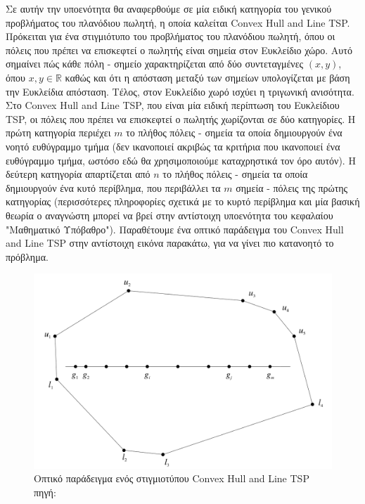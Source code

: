 \documentclass[oneside,12pt]{book}
\newcommand{\R}{\mathbb{R}}
\newenvironment{matlab}
	{\begin{figure}[hp]\centering\captionsetup{justification=centering}}
	{\end{figure}}
\theoremstyle{definition}
\begin{document}
Σε αυτήν την υποενότητα θα αναφερθούμε σε μία ειδική κατηγορία του γενικού προβλήματος του πλανόδιου πωλητή, η οποία καλείται Convex Hull and Line TSP. \\

Πρόκειται για ένα στιγμιότυπο του προβλήματος του πλανόδιου πωλητή, όπου οι πόλεις που πρέπει να επισκεφτεί ο πωλητής είναι σημεία στον Ευκλείδιο χώρο. Αυτό σημαίνει πώς κάθε πόλη - σημείο χαρακτηρίζεται από δύο συντεταγμένες \((x,y)\), όπου \(x,y \in \R\) καθώς και ότι η απόσταση μεταξύ των σημείων υπολογίζεται με βάση την Ευκλείδια απόσταση. Τέλος, στον Ευκλείδιο χωρό ισχύει η τριγωνική ανισότητα. \\

Στο Convex Hull and Line TSP, που είναι μία ειδική περίπτωση του Ευκλείδιου TSP, οι πόλεις που πρέπει να επισκεφτεί ο πωλητής χωρίζονται σε δύο κατηγορίες. Η πρώτη κατηγορία περιέχει \(m\) το πλήθος πόλεις - σημεία τα οποία δημιουργούν ένα νοητό ευθύγραμμο τμήμα (δεν ικανοποιεί ακριβώς τα κριτήρια που ικανοποιεί ένα ευθύγραμμο τμήμα, ωστόσο εδώ θα χρησιμοποιούμε καταχρηστικά τον όρο αυτόν). Η δεύτερη κατηγορία απαρτίζεται από \(n\) το πλήθος πόλεις - σημεία τα οποία δημιουργούν ένα κυτό περίβλημα, που περιβάλλει τα \(m\) σημεία - πόλεις της πρώτης κατηγορίας (περισσότερες πληροφορίες σχετικά με το κυρτό περίβλημα και μία βασική θεωρία ο αναγνώστη μπορεί να βρεί στην αντίστοιχη υποενότητα του κεφαλαίου "Μαθηματικό Υπόβαθρο"). Παραθέτουμε ένα οπτικό παράδειγμα του Convex Hull and Line TSP στην αντίστοιχη εικόνα παρακάτω, για να γίνει πιο κατανοητό το πρόβλημα. \\

\begin{matlab}
	\includegraphics[scale=0.3]{images/ConvexHullLineTSP1.png}
	\caption{Οπτικό παράδειγμα ενός στιγμιοτύπου Convex Hull and Line TSP \\ πηγή: \cite{17}}
\end{matlab}   
\end{document}
